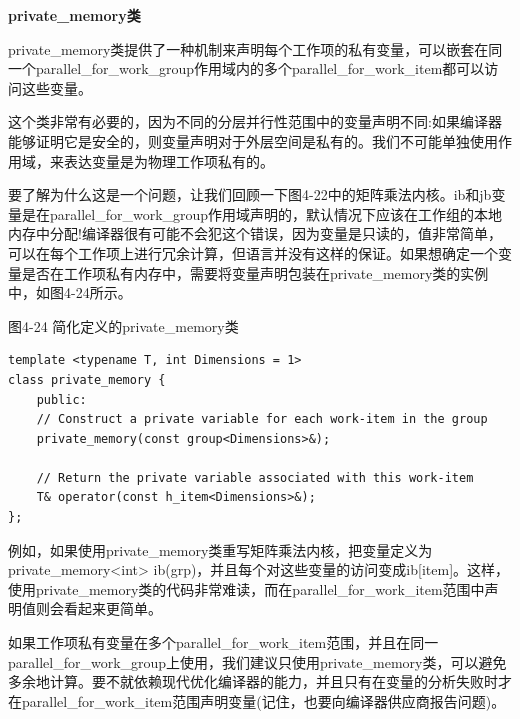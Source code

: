 \hspace*{\fill} \par %
\textbf{private\_memory类}

private\_memory类提供了一种机制来声明每个工作项的私有变量，可以嵌套在同一个parallel\_for\_work\_group作用域内的多个parallel\_for\_work\_item都可以访问这些变量。\par

这个类非常有必要的，因为不同的分层并行性范围中的变量声明不同:如果编译器能够证明它是安全的，则变量声明对于外层空间是私有的。我们不可能单独使用作用域，来表达变量是为物理工作项私有的。\par

要了解为什么这是一个问题，让我们回顾一下图4-22中的矩阵乘法内核。ib和jb变量是在parallel\_for\_work\_group作用域声明的，默认情况下应该在工作组的本地内存中分配!编译器很有可能不会犯这个错误，因为变量是只读的，值非常简单，可以在每个工作项上进行冗余计算，但语言并没有这样的保证。如果想确定一个变量是否在工作项私有内存中，需要将变量声明包装在private\_memory类的实例中，如图4-24所示。\par

\hspace*{\fill} \par %
图4-24 简化定义的private\_memory类
\begin{lstlisting}[caption={}]
template <typename T, int Dimensions = 1>
class private_memory {
	public:
	// Construct a private variable for each work-item in the group
	private_memory(const group<Dimensions>&);
	
	// Return the private variable associated with this work-item
	T& operator(const h_item<Dimensions>&);
};
\end{lstlisting}

例如，如果使用private\_memory类重写矩阵乘法内核，把变量定义为private\_memory<int> ib(grp)，并且每个对这些变量的访问变成ib[item]。这样，使用private\_memory类的代码非常难读，而在parallel\_for\_work\_item范围中声明值则会看起来更简单。\par

如果工作项私有变量在多个parallel\_for\_work\_item范围，并且在同一parallel\_for\_work\_group上使用，我们建议只使用private\_memory类，可以避免多余地计算。要不就依赖现代优化编译器的能力，并且只有在变量的分析失败时才在parallel\_for\_work\_item范围声明变量(记住，也要向编译器供应商报告问题)。\par


















